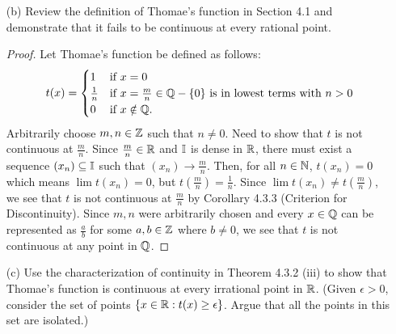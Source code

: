 \documentclass[12pt,letterpaper]{article}
\begin{document}
\begin{itemize}[leftmargin=!,labelindent=5pt]
\begin{itemize}
\begin{proof}
                        Next, choose $i \in \bbI$ arbitrarily.
                        We know that $i \in \bbR$ and $\bbQ$ is dense in $\bbR$ which means that there must exist a sequence $(y_n) \subseteq \bbQ$ such that $(y_n) \to i$.
                        Then, for all $n \in \bbN$, $g(y_n) = 1$ which means $\lim g(y_n) = 1$, but $g(i) = 0$.
                        Since $\lim g(y_n) \neq g(i)$, we see that $g$ is not continuous at $i$ by Corollary 4.3.3 (Criterion for Discontinuity).
                        
                        Since $\bbR$ consists of points from $\bbQ$ and $\bbI$, we see that $\bbR$ is nowhere-continuous.
                    \end{proof}
                \item [(b)] Review the definition of Thomae’s function in Section 4.1 and demonstrate that it fails to be continuous at every rational point.
                    \begin{proof}
                        Let Thomae’s function be defined as follows:
                        \[ t(x) =
                        \begin{cases}
                            1 & \text{if } x = 0\\
                            \frac{1}{n} & \text{if } x = \frac{m}{n} \in \mathbb{Q} - \{0\} \text{ is in lowest terms with } n > 0\\
                            0 & \text{if } x \notin \mathbb{Q}.
                        \end{cases}
                        \]
                        Arbitrarily choose $m,n \in \mathbb{Z}$ such that $n\neq 0$.
                        Need to show that $t$ is not continuous at $\frac{m}{n}$. 
                        Since $\frac{m}{n} \in \mathbb{R}$ and $\bbI$ is dense in $\bbR$, there must exist a sequence $(x_n) \subseteq \mathbb{I}$ such that $(x_n) \to \frac{m}{n}$.
                        Then, for all $n \in \bbN$, $t(x_n) = 0$ which means $\lim t(x_n) = 0$, but $t(\frac{m}{n}) = \frac{1}{n}$.
                        Since $\lim t(x_n) \neq t(\frac{m}{n})$, we see that $t$ is not continuous at $\frac{m}{n}$ by Corollary 4.3.3 (Criterion for Discontinuity).
                        Since $m,n$ were arbitrarily chosen and every $x \in \mathbb{Q}$ can be represented as $\frac{a}{b}$ for some $a,b \in \mathbb{Z}$ where $b \neq 0$, we see that $t$ is not continuous at any point in $\bbQ$.
                    \end{proof}
                \item [(c)] Use the characterization of continuity in Theorem 4.3.2 (iii) to show that Thomae’s function is continuous at every irrational point in $\bbR$. (Given $\epsilon > 0$, consider the set of points $\{x \in \mathbb{R} : t(x) \geq \epsilon\}$. Argue that all the points in this set are isolated.)

\end{itemize}
\end{itemize}
\end{document}
